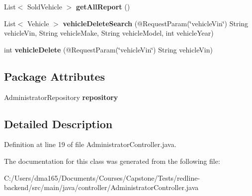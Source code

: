 \begin{DoxyCompactItemize}
\item 
\mbox{\label{classcontroller_1_1_administrator_controller_a73c032a85cbc2a8d1350fef6309d4f80}} 
List$<$ Sold\+Vehicle $>$ {\bfseries get\+All\+Report} ()
\item 
\mbox{\label{classcontroller_1_1_administrator_controller_ad81d6f585402471b2fa291e86ca3d0b3}} 
List$<$ Vehicle $>$ {\bfseries vehicle\+Delete\+Search} (@Request\+Param(\char`\"{}vehicle\+Vin\char`\"{}) String vehicle\+Vin, String vehicle\+Make, String vehicle\+Model, int vehicle\+Year)
\item 
\mbox{\label{classcontroller_1_1_administrator_controller_aecc6900cff5186192f16fcb3ffa4bbc5}} 
int {\bfseries vehicle\+Delete} (@Request\+Param(\char`\"{}vehicle\+Vin\char`\"{}) String vehicle\+Vin)
\end{DoxyCompactItemize}
\subsection*{Package Attributes}
\begin{DoxyCompactItemize}
\item 
\mbox{\label{classcontroller_1_1_administrator_controller_a5ef10417c034a193e18dea15134e8d9d}} 
Administrator\+Repository {\bfseries repository}
\end{DoxyCompactItemize}


\subsection{Detailed Description}


Definition at line 19 of file Administrator\+Controller.\+java.



The documentation for this class was generated from the following file\+:\begin{DoxyCompactItemize}
\item 
C\+:/\+Users/dma165/\+Documents/\+Courses/\+Capstone/\+Tests/redline-\/backend/src/main/java/controller/Administrator\+Controller.\+java\end{DoxyCompactItemize}
